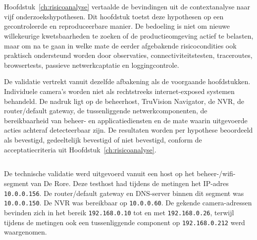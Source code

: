 
\chapter{}%
\label{ch:validatie}

Hoofdstuk~\ref{ch:risicoanalyse} vertaalde de bevindingen uit de contextanalyse naar vijf onderzoekshypothesen. Dit hoofdstuk toetst deze hypothesen op een gecontroleerde en reproduceerbare manier. De bedoeling is niet om nieuwe willekeurige kwetsbaarheden te zoeken of de productieomgeving actief te belasten, maar om na te gaan in welke mate de eerder afgebakende risicocondities ook praktisch ondersteund worden door observaties, connectiviteitstesten, traceroutes, browsertests, passieve netwerkcaptatie en loggingcontrole.

De validatie vertrekt vanuit dezelfde afbakening als de voorgaande hoofdstukken. Individuele camera's worden niet als rechtstreeks internet-exposed systemen behandeld. De nadruk ligt op de beheerhost, TruVision Navigator, de NVR, de router/default gateway, de tussenliggende netwerkcomponenten, de bereikbaarheid van beheer- en applicatiediensten en de mate waarin uitgevoerde acties achteraf detecteerbaar zijn. De resultaten worden per hypothese beoordeeld als bevestigd, gedeeltelijk bevestigd of niet bevestigd, conform de acceptatiecriteria uit Hoofdstuk~\ref{ch:risicoanalyse}.

\section{}%
\label{sec:validatie-opzet}

De technische validatie werd uitgevoerd vanuit een host op het beheer-/wifi-segment van De Rore. Deze testhost had tijdens de metingen het IP-adres \texttt{10.0.0.156}. De router/default gateway en DNS-server binnen dit segment was \texttt{10.0.0.150}. De NVR was bereikbaar op \texttt{10.0.0.60}. De gekende camera-adressen bevinden zich in het bereik \texttt{192.168.0.10} tot en met \texttt{192.168.0.26}, terwijl tijdens de metingen ook een tussenliggende component op \texttt{192.168.0.212} werd waargenomen.

